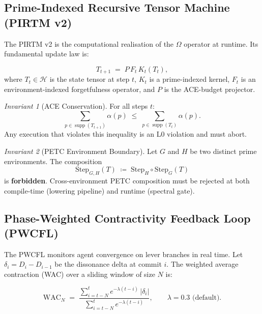 \documentclass[12pt,a4paper]{article}
\theoremstyle{definition}
\theoremstyle{plain}
\theoremstyle{remark}
\newtheorem{invariant}{Invariant}[section]
\begin{document}
\subsection{Prime-Indexed Recursive Tensor Machine (PIRTM v2)}

The PIRTM v2 is the computational realisation of the $\Omega$ operator at
runtime. Its fundamental update law is:

\begin{equation}
  \label{eq:pirtm-update}
  T_{t+1} \;=\; P\, F_t\, K_t(T_t),
\end{equation}
where $T_t \in \mathcal{H}$ is the state tensor at step $t$, $K_t$ is a
prime-indexed kernel, $F_t$ is an environment-indexed forgetfulness operator,
and $P$ is the ACE-budget projector.

\begin{invariant}[ACE Conservation]
\label{inv:ace}
For all steps $t$:
\begin{equation}
  \sum_{p \in \operatorname{supp}(T_{t+1})} \alpha(p) \;\le\;
  \sum_{p \in \operatorname{supp}(T_t)} \alpha(p).
\end{equation}
Any execution that violates this inequality is an L0 violation and must abort.
\end{invariant}

\begin{invariant}[PETC Environment Boundary]
\label{inv:petc}
Let $G$ and $H$ be two distinct prime environments. The composition
\begin{equation}
  \mathrm{Step}_{G,H}(T) \;\coloneqq\;
  \mathrm{Step}_H \circ \mathrm{Step}_G (T)
\end{equation}
is \textbf{forbidden}. Cross-environment PETC composition must be rejected at
both compile-time (lowering pipeline) and runtime (spectral gate).
\end{invariant}

\subsection{Phase-Weighted Contractivity Feedback Loop (PWCFL)}

The PWCFL monitors agent convergence on lever branches in real time. Let
$\delta_i = D_i - D_{i-1}$ be the dissonance delta at commit $i$. The
weighted average contraction (WAC) over a sliding window of size $N$ is:

\begin{equation}
  \label{eq:wac}
  \mathrm{WAC}_N \;=\;
  \frac{\displaystyle\sum_{i=t-N}^{t} e^{-\lambda(t-i)}\,|\delta_i|}
       {\displaystyle\sum_{i=t-N}^{t} e^{-\lambda(t-i)}},
  \qquad \lambda = 0.3 \text{ (default)}.
\end{equation}
\end{document}

